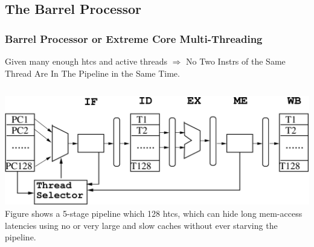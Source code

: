\documentclass{beamer}
\begin{document}
\subsection{The Barrel Processor}

\begin{frame}[fragile,t]
\frametitle{Barrel Processor or Extreme Core Multi-Threading}

\alert{Given many enough {\sc htc}s and active threads $\Rightarrow$ 
No Two Instrs of the Same Thread Are In The Pipeline in the Same Time.}

\begin{scriptsize}
\begin{columns}
\includegraphics[width=59ex]{Figures/Barrel}\pause
{}
Figure shows a 5-stage pipeline which 128 {\sc htc}s, which can
        hide long mem-access latencies using no or very large 
        and slow caches without ever starving the pipeline.
\end{columns}

\pause


\end{scriptsize}
\end{frame}
\end{document}
